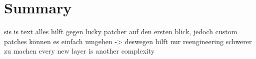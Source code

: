 \section{Summary}\label{section:conclusion-summary}
sis is text
alles hilft gegen lucky patcher auf den ersten blick, jedoch custom patches können es einfach umgehen -> deswegen hilft nur reengineering schwerer zu machen\newline
every new layer is another complexity\newline
